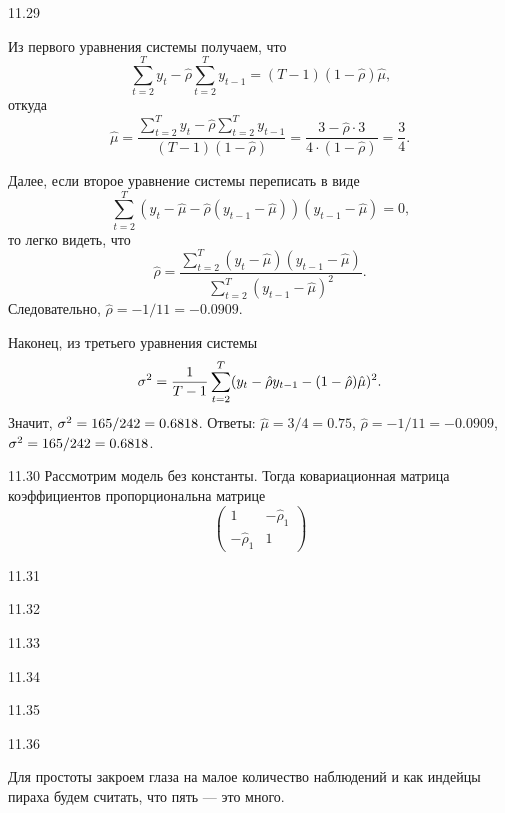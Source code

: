\begin{solution}{{11.29}}
\begin{enumerate}
Из первого уравнения системы получаем, что
\[
\sum_{t=2}^{T}y_{t} - \hat{\rho} \sum_{t=2}^{T}y_{t-1} = (T - 1) (1- \hat{\rho}) \hat{\mu} \text{,}
\]
откуда
\[
\hat{\mu} = \frac{\sum_{t=2}^{T}y_{t} - \hat{\rho} \sum_{t=2}^{T}y_{t-1}}{(T - 1) (1- \hat{\rho})} = \frac{3 - \hat{\rho} \cdot 3}{4\cdot(1-\hat{\rho})} = \frac{3}{4} \text{.}
\]

Далее, если второе уравнение системы переписать в виде
\[
\sum_{t=2}^{T}(y_t - \hat{\mu} - \hat{\rho} (y_{t-1} - \hat{\mu}))(y_{t-1} - \hat{\mu}) = 0 \text{,}
\]
то легко видеть, что
\[
\hat{\rho} = \frac{\sum_{t=2}^{T}(y_t - \hat{\mu})(y_{t-1} - \hat{\mu})}{\sum_{t=2}^{T}(y_{t-1} - \hat{\mu})^2} \text{.}
\]
Следовательно, $\hat{\rho} =-1/11= -0.0909$.

Наконец, из третьего уравнения системы
\[
\sigma^2 =\frac{1}{T-1} \sum_{t=2}^{T}(y_t - \hat{\rho} y_{t-1} - (1 - \hat{\rho}) \hat{\mu})^2 \text{.}
\]
Значит, $\sigma^2 = 165/242= 0.6818$. Ответы: $\hat{\mu} = 3/4= 0.75$, $\hat{\rho} = -1/11=-0.0909$, $\sigma^2 =165/242=0.6818$.
\end{enumerate}
\end{solution}
\protect \hypertarget {soln:11.30}{}
\begin{solution}{{11.30}}
Рассмотрим модель без константы. Тогда ковариационная матрица коэффициентов пропорциональна матрице
\[
\begin{pmatrix}
1 & -\hat{\rho}_1 \\
-\hat{\rho}_1 & 1
\end{pmatrix}
\]
\end{solution}
\protect \hypertarget {soln:11.31}{}
\begin{solution}{{11.31}}
\end{solution}
\protect \hypertarget {soln:11.32}{}
\begin{solution}{{11.32}}
\end{solution}
\protect \hypertarget {soln:11.33}{}
\begin{solution}{{11.33}}
\end{solution}
\protect \hypertarget {soln:11.34}{}
\begin{solution}{{11.34}}
\end{solution}
\protect \hypertarget {soln:11.35}{}
\begin{solution}{{11.35}}
\end{solution}
\protect \hypertarget {soln:11.36}{}
\begin{solution}{{11.36}}

Для простоты закроем глаза на малое количество наблюдений и как индейцы пираха будем считать, что пять — это много.

\end{solution}
